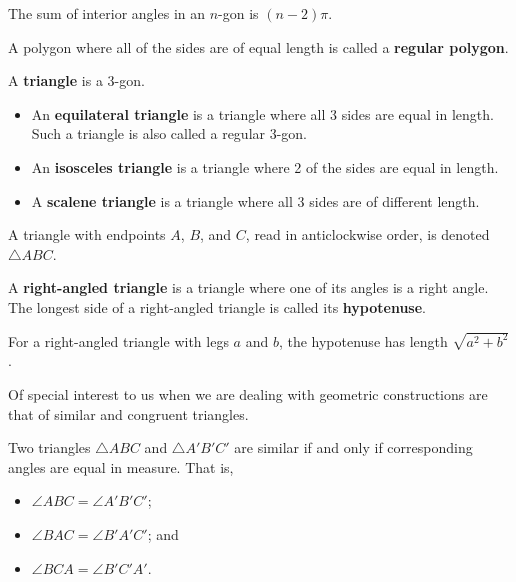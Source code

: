 \begin{proposition}
    The sum of interior angles in an $n$-gon is $(n-2)\pi$.
\end{proposition}

\begin{definition}
    A polygon where all of the sides are of equal length is called a \textbf{regular polygon}.
\end{definition}

\begin{definition}
    A \textbf{triangle} is a 3-gon.
    \begin{itemize}
        \item An \textbf{equilateral triangle} is a triangle where all 3 sides are equal in length. Such a triangle is also called a regular 3-gon.
        \item An \textbf{isosceles triangle} is a triangle where 2 of the sides are equal in length.
        \item A \textbf{scalene triangle} is a triangle where all 3 sides are of different length.
    \end{itemize}
    A triangle with endpoints $A$, $B$, and $C$, read in anticlockwise order, is denoted $\triangle ABC$.
\end{definition}

\begin{definition}
    A \textbf{right-angled triangle} is a triangle where one of its angles is a right angle. The longest side of a right-angled triangle is called its \textbf{hypotenuse}.
\end{definition}

\begin{theorem}[Pythagoras]
    For a right-angled triangle with legs $a$ and $b$, the hypotenuse has length $\sqrt{a^2 + b^2}$.
\end{theorem}

Of special interest to us when we are dealing with geometric constructions are that of similar and congruent triangles.

\begin{definition}
    Two triangles $\triangle ABC$ and $\triangle A'B'C'$ are similar if and only if corresponding angles are equal in measure. That is,
    \begin{itemize}
        \item $\angle ABC = \angle A'B'C'$;
        \item $\angle BAC = \angle B'A'C'$; and
        \item $\angle BCA = \angle B'C'A'$.
    \end{itemize}
\end{definition}

